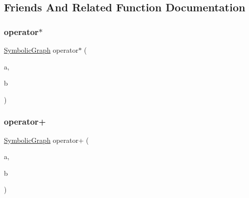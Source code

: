 \subsection{Friends And Related Function Documentation}
\mbox{\label{classsymcpp_1_1SymbolicGraph_a895a3848ca9605036f07e73412b8493b}} 
\subsubsection{\texorpdfstring{operator$\ast$}{operator*}}
{\footnotesize\ttfamily \mbox{\hyperlink{classsymcpp_1_1SymbolicGraph}{Symbolic\+Graph}} operator$\ast$ (\begin{DoxyParamCaption}\item[{\mbox{\hyperlink{classsymcpp_1_1SymbolicGraph}{Symbolic\+Graph}}}]{a,  }\item[{const \mbox{\hyperlink{classsymcpp_1_1SymbolicGraph}{Symbolic\+Graph}} \&}]{b }\end{DoxyParamCaption})\hspace{0.3cm}{\ttfamily [friend]}}

\mbox{\label{classsymcpp_1_1SymbolicGraph_aefac47289460c9fb34141bd2a20809f1}} 
\subsubsection{\texorpdfstring{operator+}{operator+}}
{\footnotesize\ttfamily \mbox{\hyperlink{classsymcpp_1_1SymbolicGraph}{Symbolic\+Graph}} operator+ (\begin{DoxyParamCaption}\item[{\mbox{\hyperlink{classsymcpp_1_1SymbolicGraph}{Symbolic\+Graph}}}]{a,  }\item[{const \mbox{\hyperlink{classsymcpp_1_1SymbolicGraph}{Symbolic\+Graph}} \&}]{b }\end{DoxyParamCaption})\hspace{0.3cm}{\ttfamily [friend]}}

\mbox{\label{classsymcpp_1_1SymbolicGraph_af0e10f19ffb94557b68c8f10b110f030}} 
